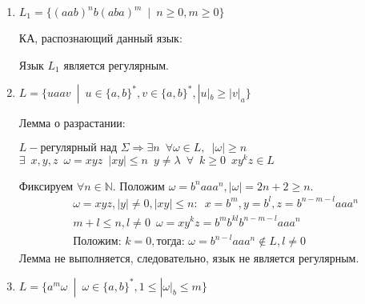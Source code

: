 \documentclass[a4paper, 12pt] {article} %
\begin{document}
\begin{enumerate}
    \item 
    $L_1 = \{(aab)^n b(aba)^m \enspace | \enspace n\ge 0, m\ge 0\}$
    
    КА, распознающий данный язык:
    \begin{center}
    \end{center}
    Язык $L_1$ является регулярным. \\
    
    \item 
    $L = \{uaav \enspace | \enspace u \in \{a,b\}^*, v \in \{a,b\}^*, |u|_b \ge |v|_a \}$
    
    Лемма о разрастании:
    \begin{center}
        $L - \text{регулярный над } \Sigma \Rightarrow \exists n \enspace \forall \omega \in L, \enspace |\omega| \ge n$ \\
        $\exists \enspace x,y,z \enspace \omega = xyz \enspace |xy| \le n \enspace y \ne \lambda \enspace \forall \enspace k \ge 0 \enspace xy^kz \in L$
    \end{center}
    
    Фиксируем $\forall n \in \mathbb{N}$. Положим $\omega = b^n aaa^n, |\omega| = 2n+2 \ge n$.
    \begin{align*}
        &\omega = xyz, |y| \ne 0, |xy| \le n : \enspace x = b^m, y = b^l, z = b^{n-m-l}aaa^n \\
        &m+l \le n, l \ne 0 \enspace \omega = xy^kz = b^{m}b^{kl}b^{n-m-l}aaa^n \\
        &\text{Положим: } k=0, \text{тогда: } \omega = b^{n-l}aaa^n \notin L, l \ne 0
    \end{align*}
    Лемма не выполняется, следовательно, язык не является регулярным. \\

    \item 
    $L = \{a^m\omega \enspace | \enspace \omega \in \{a,b\}^*, 1 \le |\omega|_b \le m\}$
    

\end{enumerate}
\end{document}
